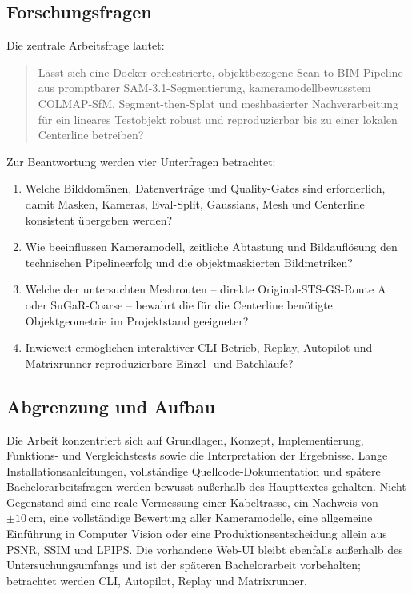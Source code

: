 \subsection{Forschungsfragen}

Die zentrale Arbeitsfrage lautet:
\begin{quote}
Lässt sich eine Docker-orchestrierte, objektbezogene Scan-to-BIM-Pipeline aus
promptbarer SAM-3.1-Segmentierung, kameramodellbewusstem COLMAP-SfM,
Segment-then-Splat und meshbasierter Nachverarbeitung für ein lineares
Testobjekt robust und reproduzierbar bis zu einer lokalen Centerline betreiben?
\end{quote}

Zur Beantwortung werden vier Unterfragen betrachtet:

\begin{enumerate}
  \item Welche Bilddomänen, Datenverträge und Quality-Gates sind erforderlich,
	  damit Masken, Kameras, Eval-Split, Gaussians, Mesh und Centerline
	  konsistent übergeben werden?
  \item Wie beeinflussen Kameramodell, zeitliche Abtastung und Bildauflösung
	  den technischen Pipelineerfolg und die objektmaskierten Bildmetriken?
  \item Welche der untersuchten Meshrouten -- direkte Original-STS-GS-Route A
	  oder SuGaR-Coarse -- bewahrt die für die Centerline benötigte
	  Objektgeometrie im Projektstand geeigneter?
  \item Inwieweit ermöglichen interaktiver CLI-Betrieb, Replay, Autopilot und
	  Matrixrunner reproduzierbare Einzel- und Batchläufe?
\end{enumerate}

\subsection{Abgrenzung und Aufbau}

Die Arbeit konzentriert sich auf Grundlagen, Konzept, Implementierung,
Funktions- und Vergleichstests sowie die Interpretation der Ergebnisse. Lange
Installationsanleitungen, vollständige Quellcode-Dokumentation und spätere
Bachelorarbeitsfragen werden bewusst außerhalb des Haupttextes gehalten. Nicht
Gegenstand sind eine reale Vermessung einer Kabeltrasse, ein Nachweis von
$\pm10\,\mathrm{cm}$, eine vollständige Bewertung aller Kameramodelle, eine
allgemeine Einführung in Computer Vision oder eine Produktionsentscheidung
allein aus PSNR, SSIM und LPIPS. Die vorhandene Web-UI bleibt ebenfalls
außerhalb des Untersuchungsumfangs und ist der späteren Bachelorarbeit
vorbehalten; betrachtet werden CLI, Autopilot, Replay
und Matrixrunner.
